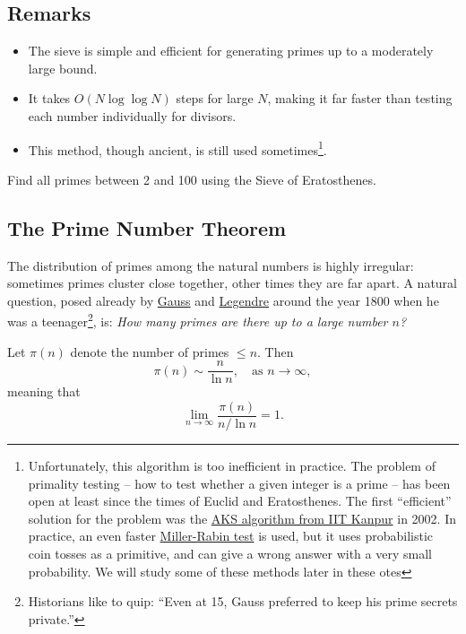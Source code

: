 \subsection*{Remarks}
\begin{itemize}
\item The sieve is simple and efficient for generating primes up to a moderately large bound.
\item It takes  $O(N \log \log N)$ steps for large $N$, making it far faster than testing each number individually for divisors.
\item This method, though ancient, is still used sometimes\footnote{Unfortunately, this algorithm is too inefficient in practice. The problem of primality testing -- how to test whether a given integer is a prime -- has been open  at least since the times of Euclid and Eratosthenes. The first ``efficient'' solution for the problem was the \href{https://en.wikipedia.org/wiki/AKS_primality_test}{AKS algorithm from IIT Kanpur} in 2002. In practice, an even faster \href{https://en.wikipedia.org/wiki/Miller–Rabin_primality_test}{Miller-Rabin test} is used, but it uses probabilistic coin tosses as a primitive, and can give a wrong answer with a very small probability. We will study some of these methods later in these otes}.
\end{itemize}

\begin{exercise}
Find all primes between 2 and 100 using the Sieve of Eratosthenes.
\end{exercise}

\subsection{The Prime Number Theorem}

The distribution of primes among the natural numbers is highly irregular: 
sometimes primes cluster close together, other times they are far apart. 
A natural question, posed already by \href{https://en.wikipedia.org/wiki/Carl\_Friedrich\_Gauss}{Gauss} and \href{https://en.wikipedia.org/wiki/Adrien-Marie\_Legendre}{Legendre} around the year 1800 when he was a teenager\footnote{Historians like to quip: ``Even at 15, Gauss preferred to keep his prime secrets private.''}, is:
\emph{How many primes are there up to a large number $n$?}

\begin{theorem}
\label{thm:primenumber}
Let $\pi(n)$ denote the number of primes $\leq n$. Then
\[
\pi(n) \sim \frac{n}{\ln n}, \quad \text{as } n \to \infty,
\]
meaning that
\[
\lim_{n\to\infty} \frac{\pi(n)}{n/\ln n} = 1.
\]
\end{theorem}

